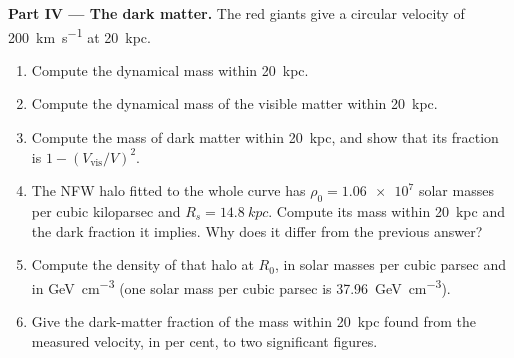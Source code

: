 \begin{problem}
\medskip\noindent\textbf{Part IV --- The dark matter.} The red giants
give a circular velocity of \qty{200}{km.s^{-1}} at \qty{20}{kpc}.
\begin{enumerate}[resume]
\item Compute the dynamical mass within \qty{20}{kpc}.
\item Compute the dynamical mass of the visible matter within
  \qty{20}{kpc}.
\item Compute the mass of dark matter within \qty{20}{kpc}, and show that
  its fraction is $1 - (V_\mathrm{vis}/V)^2$.
\item The NFW halo fitted to the whole curve has
  $\rho_0 = \num{1.06e7}$ solar masses per cubic kiloparsec and
  $R_s = \qty{14.8}{kpc}$. Compute its mass within \qty{20}{kpc} and the
  dark fraction it implies. Why does it differ from the previous answer?
\item Compute the density of that halo at $R_0$, in solar masses per
  cubic parsec and in \unit{GeV.cm^{-3}} (one solar mass per cubic parsec
  is \qty{37.96}{GeV.cm^{-3}}).
\item Give the dark-matter fraction of the mass within \qty{20}{kpc}
  found from the measured velocity, in per cent, to two significant
  figures.
\end{enumerate}
\end{problem}

